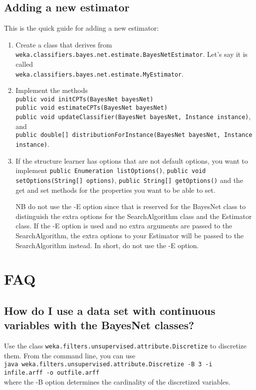 \documentclass[a4paper]{article}
\begin{document}
\subsection*{Adding a new estimator}

This is the quick guide for adding a new estimator:

\begin{enumerate}
\item Create a class that derives from \\
  {\tt weka.classifiers.bayes.net.estimate.BayesNetEstimator}.
  Let's say it is called \\
  {\tt weka.classifiers.bayes.net.estimate.MyEstimator}.

\item Implement the methods\\
{\tt public void initCPTs(BayesNet bayesNet)} \\
{\tt public void estimateCPTs(BayesNet bayesNet)} \\
{\tt public void updateClassifier(BayesNet bayesNet, Instance instance)}, and \\
{\tt  public double[] distributionForInstance(BayesNet bayesNet, Instance instance)}.

\item If the structure learner has options that are not default options,
you want to implement {\tt public Enumeration listOptions()},
{\tt public void setOptions(String[] options)},
{\tt public String[] getOptions()} and the get and set methods for
the properties you want to be able to set.

NB do not use the -E option since that is reserved for the BayesNet class to 
distinguish the extra options for the SearchAlgorithm class and the Estimator class.
If the -E option is used and no extra arguments are passed to the SearchAlgorithm,
the extra options to your Estimator will be passed to the SearchAlgorithm
instead. In short, do not use the -E option.
\end{enumerate}

\section{FAQ}

\subsection*{How do I use a data set with continuous variables with the BayesNet classes?}
Use the class {\tt weka.filters.unsupervised.attribute.Discretize} to discretize them.
From the command line, you can use\\
{\tt java weka.filters.unsupervised.attribute.Discretize -B 3 -i infile.arff -o outfile.arff}\\
where the -B option determines the cardinality of the discretized variables.
\end{document}
